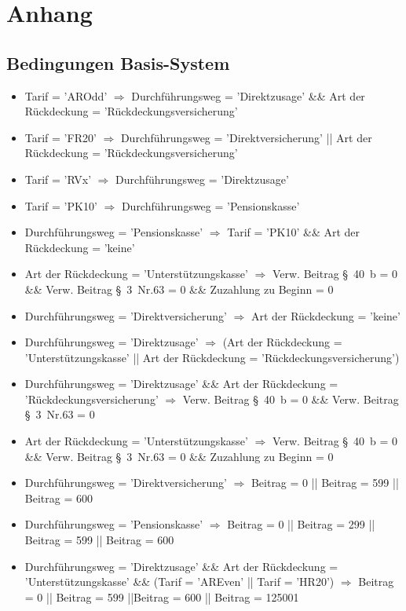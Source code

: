\chapter{Anhang}

\section{Bedingungen Basis-System}\label{sec:bedingungenSimple}

\footnotesize

\begin{itemize}
\item Tarif = 'AROdd' $\Rightarrow$ Durchführungsweg = 'Direktzusage' \&\& Art der Rückdeckung = 'Rückdeckungsversicherung'
\item Tarif = 'FR20' $\Rightarrow$ Durchführungsweg = 'Direktversicherung' || Art der Rückdeckung = 'Rückdeckungsversicherung'
\item Tarif = 'RVx' $\Rightarrow$ Durchführungsweg = 'Direktzusage'
\item Tarif = 'PK10' $\Rightarrow$ Durchführungsweg = 'Pensionskasse'
\item Durchführungsweg = 'Pensionskasse' $\Rightarrow$ Tarif = 'PK10' \&\& Art der Rückdeckung = 'keine'
\item Art der Rückdeckung = 'Unterstützungskasse' $\Rightarrow$ Verw. Beitrag §~40~b = 0 \&\& Verw. Beitrag §~3~Nr.63 = 0 \&\& Zuzahlung zu Beginn = 0
\item Durchführungsweg = 'Direktversicherung' $\Rightarrow$ Art der Rückdeckung = 'keine'
\item Durchführungsweg = 'Direktzusage' $\Rightarrow$ (Art der Rückdeckung = 'Unterstützungskasse' || Art der Rückdeckung = 'Rückdeckungsversicherung')
\item Durchführungsweg = 'Direktzusage' \&\& Art der Rückdeckung = 'Rückdeckungsversicherung' $\Rightarrow$ Verw. Beitrag §~40~b = 0 \&\& Verw. Beitrag §~3~Nr.63 = 0
\item Art der Rückdeckung = 'Unterstützungskasse' $\Rightarrow$ Verw. Beitrag §~40~b = 0 \&\& Verw. Beitrag §~3~Nr.63 = 0 \&\& Zuzahlung zu Beginn = 0
\item Durchführungsweg = 'Direktversicherung' $\Rightarrow$ Beitrag = 0 || Beitrag = 599 || Beitrag = 600
\item Durchführungsweg = 'Pensionskasse' $\Rightarrow$ Beitrag = 0 || Beitrag = 299 || Beitrag = 599 || Beitrag = 600
\item Durchführungsweg = 'Direktzusage' \&\& Art der Rückdeckung = 'Unterstützungskasse' \&\& (Tarif = 'AREven' || Tarif = 'HR20') $\Rightarrow$ Beitrag = 0 || Beitrag = 599 ||Beitrag = 600 || Beitrag = 125001

\end{itemize}
